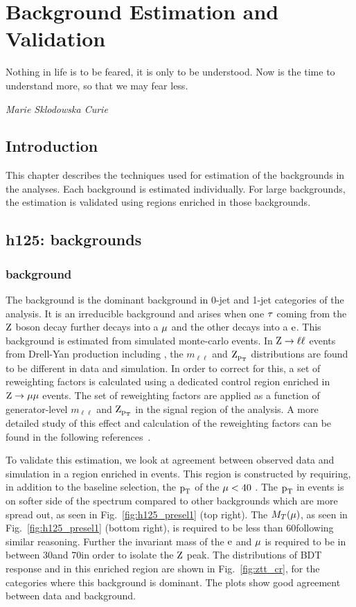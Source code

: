 \chapter{Background Estimation and Validation}
\label{bg_val}
\epigraph{Nothing in life is to be feared, it is only to be understood. Now is the time to understand more, so that we may fear less.}{\textit{Marie Sklodowska Curie}}
\vskip 0.5in
\section{Introduction}
This chapter describes the techniques used for estimation of the backgrounds in the analyses. Each background is estimated individually. For large backgrounds, the estimation is validated using regions enriched in those backgrounds.

\section{h125: \hmue backgrounds}
\label{h125_bg_val}

\subsection{\ztt background}
\label{h125_ztt}
The \ztt background is the dominant background in 0-jet and 1-jet categories of the analysis. It is an irreducible background and arises when one $\tau$ coming from the $\text{Z}$ boson decay further decays into a $\mu$ and the other decays into a $\text{e}$. This background is estimated from simulated monte-carlo events. In $\text{Z} \to \ell \ell$ events from Drell-Yan production including \ztt, the $m_{\ell\ell}$ and $\text{Z}_{\text{p}_\text{T}}$ distributions are found to be different in data and simulation. In order to correct for this, a set of reweighting factors is calculated using a dedicated control region enriched in $\text{Z} \to \mu\mu$ events. The set of reweighting factors are applied as a function of generator-level $m_{\ell\ell}$ and $\text{Z}_{\text{p}_\text{T}}$ in the signal region of the analysis. A more detailed study of this effect and calculation of the reweighting factors can be found in the following references~\cite{CMS-PAS-HIG-16-043}.

To validate this estimation, we look at agreement between observed data and simulation in a region enriched in \ztt events. This region is constructed by requiring, in addition to the baseline selection,  the $\text{p}_\text{T}$ of the $\mu<40$ \GeV. The $\text{p}_\text{T}$ in \ztt events is on softer side of the spectrum compared to other backgrounds which are more spread out, as seen in Fig.~\ref{fig:h125_presel1} (top right). The $M_T(\mu)$, as seen in Fig.~\ref{fig:h125_presel1} (bottom right), is required to be less than 60\GeV following similar reasoning. Further the invariant mass of the $\text{e}$ and $\mu$ is required to be in between 30\GeV and 70\GeV in order to isolate the $\text{Z}$ peak. The distributions of BDT response and \mcol in this \ztt enriched region are shown in Fig.~\ref{fig:ztt_cr}, for the categories where this background is dominant. The plots show good agreement between data and background.



